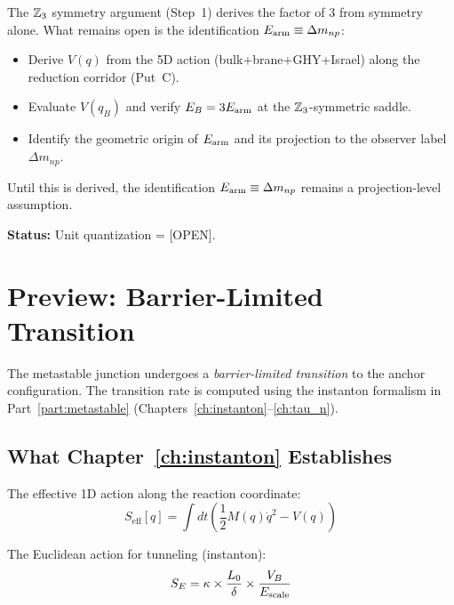\begin{edcopenbox}[title=Open: Unit Quantization and 5D Origin of $\Earm$]
    The $\mathbb{Z}_3$ symmetry argument (Step~1) derives the factor of 3 from
    symmetry alone. What remains open is the identification $E_{\text{arm}} \equiv \Delta m_{np}$:
    \begin{itemize}
        \item Derive $V(q)$ from the 5D action (bulk+brane+GHY+Israel) along
              the reduction corridor (Put~C). \tagOPEN
        \item Evaluate $V(q_B)$ and verify $E_B = 3E_{\text{arm}}$ at the $\mathbb{Z}_3$-symmetric
              saddle. \tagOPEN
        \item Identify the geometric origin of $\Earm$ and its projection to
              the observer label $\Delta m_{np}$. \tagOPEN
    \end{itemize}

    Until this is derived, the identification $E_{\text{arm}} \equiv \Delta m_{np}$
    remains a projection-level assumption. \tagOPEN

    \textbf{Status:} Unit quantization = [OPEN].
\end{edcopenbox}

\section{Preview: Barrier-Limited Transition}
\label{sec:metastable:preview}

The metastable junction undergoes a \emph{barrier-limited transition} to the
anchor configuration. The transition rate is computed using the instanton
formalism in Part~\ref{part:metastable} (Chapters~\ref{ch:instanton}--\ref{ch:tau_n}).

\subsection{What Chapter~\ref{ch:instanton} Establishes}

The effective 1D action along the reaction coordinate:
\begin{equation}
    S_{\text{eff}}[q] = \int dt \left( \frac{1}{2} M(q) \dot{q}^2 - V(q) \right)
\end{equation}

The Euclidean action for tunneling (instanton):
\begin{equation}
    S_E = \kappa \times \frac{L_0}{\delta} \times \frac{V_B}{E_{\text{scale}}}
\end{equation}

